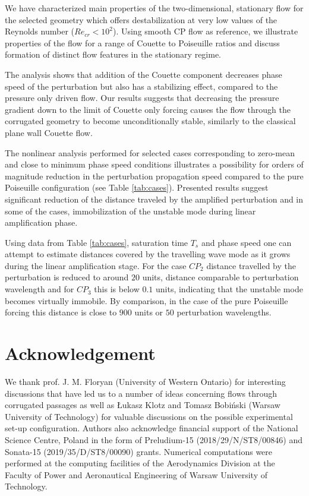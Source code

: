 \documentclass[lineno]{jfm}
\begin{document}
We have characterized main properties of the two-dimensional, stationary flow for the selected geometry which offers destabilization at very low values of the Reynolds number ($Re_{cr}<10^2$).
Using smooth CP flow as reference, we illustrate properties of the flow for a range of Couette to Poiseuille ratios and discuss formation of distinct flow features in the stationary regime.

The analysis shows that addition of the Couette component decreases phase speed of the perturbation but also has a stabilizing effect, compared to the pressure only driven flow.
Our results suggests that decreasing the pressure gradient down to the limit of Couette only forcing causes the flow through the corrugated geometry to become unconditionally stable, similarly to the classical plane wall Couette flow.

The nonlinear analysis performed for selected cases corresponding to zero-mean and close to minimum phase speed conditions illustrates a possibility for orders of magnitude reduction in the perturbation propagation speed compared to the pure Poiseuille configuration (see Table \ref{tab:cases}).
Presented results suggest significant reduction of the distance traveled by the amplified perturbation and in some of the cases, immobilization of the unstable mode during linear amplification phase.

Using data from Table \ref{tab:cases}, saturation time $T_s$ and phase speed one can attempt to estimate distances covered by the travelling wave mode as it grows during the linear amplification stage.
For the case $CP_2$ distance travelled by the perturbation is reduced to around $20$ units, distance comparable to perturbation wavelength and for $CP_3$ this is below $0.1$ units,
indicating that the unstable mode becomes virtually immobile.
By comparison, in the case of the pure Poiseuille forcing this distance is close to $900$ units or $50$ perturbation wavelengths.


\section*{Acknowledgement}
We thank prof. J. M. Floryan (University of Western Ontario) for interesting discussions that have led us to a number of ideas concerning flows through corrugated passages as well as Łukasz Klotz and Tomasz Bobiński (Warsaw University of Technology) for valuable discussions on the possible experimental set-up configuration.
Authors also acknowledge financial support of the National Science Centre, Poland in the form of Preludium-15 (2018/29/N/ST8/00846) and Sonata-15 (2019/35/D/ST8/00090) grants.
Numerical computations were performed at the computing facilities of the Aerodynamics Division at the Faculty of Power and Aeronautical Engineering of Warsaw University of Technology.
\end{document}
